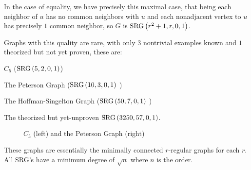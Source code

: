 \begin{remark}
	In the case of equality, we have precisely this maximal case, that being each neighbor of $u$ has no common neighbors with $u$ and each nonadjacent vertex to  $u$ has precisely $1$ common neighbor, so $G$ is $\operatorname{SRG} \left( r^2 + 1, r, 0, 1 \right) $.
\end{remark}
\begin{example}
	Graphs with this quality are rare, with only $3$ nontrivial examples known and $1$ theorized but not yet proven, these are:\begin{enumerate*}
		\item $C_5$ ($\operatorname{SRG}\left( 5, 2, 0, 1 \right) $)
		\item The Peterson Graph ($\operatorname{SRG} \left( 10, 3, 0, 1 \right) $ )
		\item The Hoffman-Singelton Graph ($\operatorname{SRG}\left( 50, 7, 0, 1 \right) $ )
		\item The theorized but yet-unproven $\operatorname{SRG}\left( 3250, 57, 0, 1 \right) $.
	\end{enumerate*}

\begin{figure}[ht]
    \centering
    \caption{$C_5$ (left) and the Peterson Graph (right)}
    \label{fig:c5.svg.2021_08_25_13_14_48.}
\end{figure}
\end{example}
These graphs are essentially the minimally connected $r$-regular graphs for each $r$. All  SRG's have a minimum degree of $\sqrt{n}$ where $n$ is the order.

